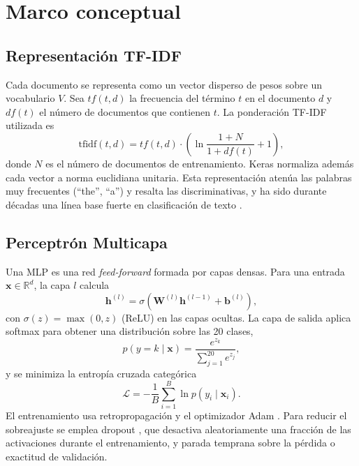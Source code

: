 \documentclass[11pt,letterpaper]{article}
\begin{document}
\section{Marco conceptual}\label{sec:marco}

\subsection{Representación TF-IDF}

Cada documento se representa como un vector disperso de pesos sobre un vocabulario $V$. Sea $tf(t,d)$ la frecuencia del término $t$ en el documento $d$ y $df(t)$ el número de documentos que contienen $t$. La ponderación TF-IDF utilizada es
\begin{equation}
  \mathrm{tfidf}(t,d) = tf(t,d)\cdot\left(\ln\frac{1+N}{1+df(t)} + 1\right),
\end{equation}
donde $N$ es el número de documentos de entrenamiento. Keras normaliza además cada vector a norma euclidiana unitaria. Esta representación atenúa las palabras muy frecuentes (``the'', ``a'') y resalta las discriminativas, y ha sido durante décadas una línea base fuerte en clasificación de texto \cite{joachims1998}.

\subsection{Perceptrón Multicapa}

Una MLP es una red \textit{feed-forward} formada por capas densas. Para una entrada $\mathbf{x}\in\mathbb{R}^{d}$, la capa $l$ calcula
\begin{equation}
  \mathbf{h}^{(l)} = \sigma\left(\mathbf{W}^{(l)}\mathbf{h}^{(l-1)} + \mathbf{b}^{(l)}\right),
\end{equation}
con $\sigma(z)=\max(0,z)$ (ReLU) en las capas ocultas. La capa de salida aplica softmax para obtener una distribución sobre las 20 clases,
\begin{equation}
  p(y=k\mid\mathbf{x}) = \frac{e^{z_k}}{\sum_{j=1}^{20} e^{z_j}},
\end{equation}
y se minimiza la entropía cruzada categórica
\begin{equation}
  \mathcal{L} = -\frac{1}{B}\sum_{i=1}^{B}\ln p(y_i\mid\mathbf{x}_i).
\end{equation}
El entrenamiento usa retropropagación \cite{rumelhart1986} y el optimizador Adam \cite{kingma2015}. Para reducir el sobreajuste se emplea dropout \cite{srivastava2014}, que desactiva aleatoriamente una fracción de las activaciones durante el entrenamiento, y parada temprana sobre la pérdida o exactitud de validación.
\end{document}
